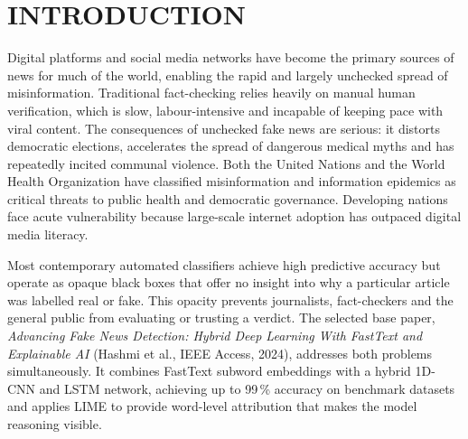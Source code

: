 \documentclass[12pt,a4paper,oneside]{report}
\renewcommand{\headrulewidth}{0.4pt}
\renewcommand{\footrulewidth}{0.4pt}
\renewcommand{\headrulewidth}{0pt}
\renewcommand{\footrulewidth}{0pt}
\renewcommand{\headrulewidth}{0pt}
\renewcommand{\footrulewidth}{0pt}
\begin{document}
\pagestyle{fancy}
\fancyhf{}
\fancyhead[R]{\small\nouppercase{\leftmark}}
\fancyfoot[R]{\small\thepage}
\renewcommand{\headrulewidth}{0.4pt}
\renewcommand{\footrulewidth}{0.4pt}

\fancypagestyle{plain}{
  \fancyhf{}
  \fancyfoot[C]{\small\thepage}
  \renewcommand{\headrulewidth}{0pt}
  \renewcommand{\footrulewidth}{0pt}
}

\chapter{INTRODUCTION}

Digital platforms and social media networks have become the primary sources of news
for much of the world, enabling the rapid and largely unchecked spread of misinformation.
Traditional fact-checking relies heavily on manual human verification, which is slow,
labour-intensive and incapable of keeping pace with viral content. The consequences of
unchecked fake news are serious: it distorts democratic elections, accelerates the spread
of dangerous medical myths and has repeatedly incited communal violence. Both the United
Nations and the World Health Organization have classified misinformation and information
epidemics as critical threats to public health and democratic governance. Developing
nations face acute vulnerability because large-scale internet adoption has outpaced digital
media literacy.

Most contemporary automated classifiers achieve high predictive accuracy but operate as
opaque black boxes that offer no insight into why a particular article was labelled real or
fake. This opacity prevents journalists, fact-checkers and the general public from
evaluating or trusting a verdict. The selected base paper, \textit{Advancing Fake News
Detection: Hybrid Deep Learning With FastText and Explainable AI} (Hashmi et al., IEEE
Access, 2024), addresses both problems simultaneously. It combines FastText subword
embeddings with a hybrid 1D-CNN and LSTM network, achieving up to 99\,\% accuracy on
benchmark datasets and applies LIME to provide word-level attribution that makes the
model reasoning visible.
\end{document}
